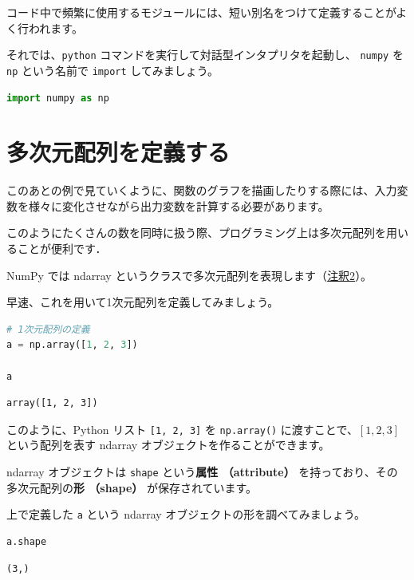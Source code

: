 コード中で頻繁に使用するモジュールには、短い別名をつけて定義することがよく行われます。


それでは、\texttt{python} コマンドを実行して対話型インタプリタを起動し、 \texttt{numpy} を \texttt{np} という名前で \texttt{import} してみましょう。


\begin{lstlisting}[style=codecell,language=Python]
import numpy as np
\end{lstlisting}

\section{多次元配列を定義する}


このあとの例で見ていくように、関数のグラフを描画したりする際には、入力変数を様々に変化させながら出力変数を計算する必要があります。

このようにたくさんの数を同時に扱う際、プログラミング上は多次元配列を用いることが便利です．

NumPy では ndarray というクラスで多次元配列を表現します（\hyperref[03-reviewing-elementary-math-with-numpy-and-matplotlib-note2]{注釈2}）。

早速、これを用いて1次元配列を定義してみましょう。


\begin{lstlisting}[style=codecell,language=Python]
# 1次元配列の定義
a = np.array([1, 2, 3])

a
\end{lstlisting}

\begin{lstlisting}[style=outputcell]
array([1, 2, 3])
\end{lstlisting}

このように、Python リスト \texttt{[1, 2, 3]} を \texttt{np.array()} に渡すことで、$[1, 2, 3]$ という配列を表す ndarray オブジェクトを作ることができます。

ndarray オブジェクトは \texttt{shape} という\textbf{属性 （attribute）} を持っており、その多次元配列の\textbf{形 （shape）} が保存されています。

上で定義した \texttt{a} という ndarray オブジェクトの形を調べてみましょう。


\begin{lstlisting}[style=codecell,language=Python]
a.shape
\end{lstlisting}

\begin{lstlisting}[style=outputcell]
(3,)
\end{lstlisting}

